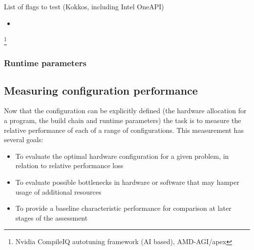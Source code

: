 List of flags to test (Kokkos, including Intel OneAPI)
\begin{itemize}
	\item{} 
\end{itemize}



\footnote{Nvidia CompileIQ autotuning framework (AI based), AMD-AGI/apex}


\subsubsection{Runtime parameters}





\subsection{Measuring configuration performance}
Now that the configuration can be explicitly defined (the hardware allocation for a program, the build chain and runtime parameters) the task is to measure the relative performance of each of a range of configurations. This measurement has several goals:
\begin{itemize}
	\item{To evaluate the optimal hardware configuration for a given problem, in relation to relative performance loss}
	\item{To evaluate possible bottlenecks in hardware or software that may hamper usage of additional resources}
	\item{To provide a baseline characteristic performance for comparison at later stages of the assessment}
\end{itemize}



